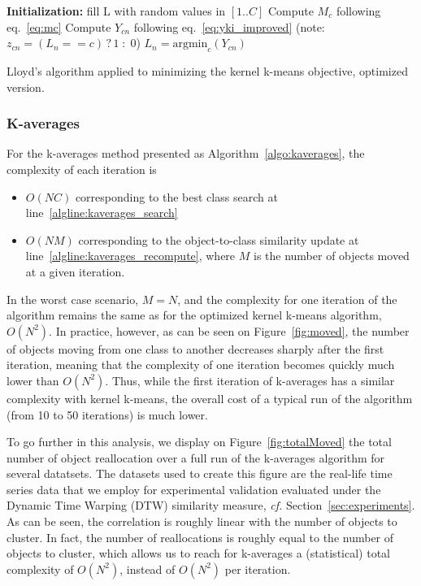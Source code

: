 \documentclass[natbib,smallextended]{svjour3}
\begin{document}
\begin{algorithm}
	\label{algo:kkmeans_optim}
	\SetAlgoLined
	\BlankLine
	\textbf{Initialization:}
	fill L with random values in $[1..C]$\;
	\BlankLine
	 {
	     {
	        Compute $M_c$ following eq.~\ref{eq:mc} \label{algline:kkmeans_imp_mc}
	    }
		 {
			 {
				Compute $Y_{cn}$ following eq.~\ref{eq:yki_improved} \label{algline:kkmeans_imp_cplx1}
				(note: $z_{cn} = (L_n == c)\,?\,1\;:\;0$)
			}
			$L_n = \textrm{argmin}_c (Y_{cn})$\;
		}
	}
	\BlankLine
	\caption{Lloyd's algorithm applied to minimizing the kernel k-means objective, optimized version.}
\end{algorithm}


\subsubsection{K-averages}

For the k-averages method presented as Algorithm~\ref{algo:kaverages}, the complexity of each iteration is
\begin{itemize}
\item $O(NC)$ corresponding to the best class search at line~\ref{algline:kaverages_search}
\item  $O(NM)$ corresponding to the object-to-class similarity update at line~\ref{algline:kaverages_recompute}, where $M$ is the number of objects moved at a given iteration.
\end{itemize}

In the worst case scenario, $M = N$, and the complexity for one iteration of the algorithm remains the same as for the optimized kernel k-means algorithm, $O(N^2)$. In practice, however, as can be seen on Figure~\ref{fig:moved}, the number of objects moving from one class to another decreases sharply after the first iteration, meaning that the complexity of one iteration becomes quickly much lower than $O(N^2)$. Thus, while the first iteration of k-averages has a similar complexity with kernel k-means, the overall cost of a typical run of the algorithm (from 10 to 50 iterations) is much lower.


To go further in this analysis, we display on Figure~\ref{fig:totalMoved}  the total number of object reallocation over a full run of the k-averages algorithm for several datatsets. The datasets used to create this figure are the real-life time series data that we employ for experimental validation evaluated under the Dynamic Time Warping (DTW) similarity measure, \textit{cf.} Section~\ref{sec:experiments}. As can be seen, the correlation is roughly linear with the number of objects to cluster. In fact, the number of reallocations is roughly equal to the number of objects to cluster, which allows us to reach for k-averages a (statistical) total complexity of $O(N^2)$, instead of $O(N^2)$ per iteration.
\end{document}
